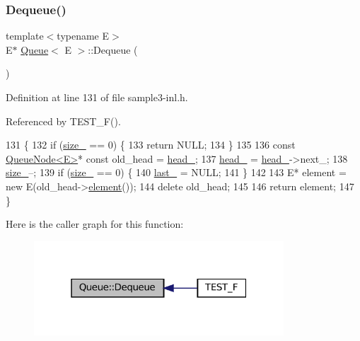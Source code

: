 \subsubsection{\texorpdfstring{Dequeue()}{Dequeue()}}
{\footnotesize\ttfamily template$<$typename E$>$ \\
E$\ast$ \hyperlink{classQueue}{Queue}$<$ E $>$\+::Dequeue (\begin{DoxyParamCaption}{ }\end{DoxyParamCaption})\hspace{0.3cm}{\ttfamily [inline]}}



Definition at line 131 of file sample3-\/inl.\+h.



Referenced by T\+E\+S\+T\+\_\+\+F().


\begin{DoxyCode}
131                \{
132     \textcolor{keywordflow}{if} (\hyperlink{classQueue_a7ac3c0717d894e1aecc56f4ddb35c7ea}{size\_} == 0) \{
133       \textcolor{keywordflow}{return} NULL;
134     \}
135 
136     \textcolor{keyword}{const} \hyperlink{classQueueNode}{QueueNode<E>}* \textcolor{keyword}{const} old\_head = \hyperlink{classQueue_abf9219bcea800d26e8bfdb4777d98729}{head\_};
137     \hyperlink{classQueue_abf9219bcea800d26e8bfdb4777d98729}{head\_} = \hyperlink{classQueue_abf9219bcea800d26e8bfdb4777d98729}{head\_}->next\_;
138     \hyperlink{classQueue_a7ac3c0717d894e1aecc56f4ddb35c7ea}{size\_}--;
139     \textcolor{keywordflow}{if} (\hyperlink{classQueue_a7ac3c0717d894e1aecc56f4ddb35c7ea}{size\_} == 0) \{
140       \hyperlink{classQueue_a7466dca4f96147c9124af582ab170df0}{last\_} = NULL;
141     \}
142 
143     E* element = \textcolor{keyword}{new} E(old\_head->\hyperlink{classQueueNode_a1c61b3ed32e089f5901b87022ef84985}{element}());
144     \textcolor{keyword}{delete} old\_head;
145 
146     \textcolor{keywordflow}{return} element;
147   \}
\end{DoxyCode}
Here is the caller graph for this function\+:
\nopagebreak
\begin{figure}[H]
\begin{center}
\leavevmode
\includegraphics[width=265pt]{classQueue_a434d465001c3078e999f7a89a8af84c0_icgraph}
\end{center}
\end{figure}
\mbox{\label{classQueue_abaa2e7175457307bca74f5562cbdaaa9}} 
